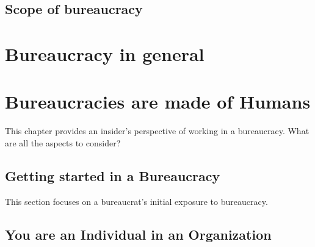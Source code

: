 \documentclass{book}
\begin{document}
  \section{Scope of bureaucracy}
    

\chapter{Bureaucracy in general}
   \clearpage
   \clearpage
  \clearpage
   \clearpage
   \clearpage
   \clearpage
   \clearpage

\chapter{Bureaucracies are made of Humans\label{b_made_of_humans}}

This chapter provides an insider's perspective of working in a bureaucracy. What are all the aspects to consider?

  \section{Getting started in a Bureaucracy}
    This section focuses on a bureaucrat's initial exposure to bureaucracy. 
  
    
    
    
    
    
    
    
  \newpage
  \section{You are an Individual in an Organization}
  
\end{document}
